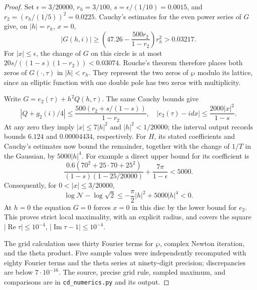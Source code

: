 \begin{proof}
Set $\epsilon=3/20000$, $r_h=3/100$, $s=\epsilon/(1/10)=0.0015$,
and $r_2=(r_h/(1/5))^2=0.0225$.
Cauchy's estimates for the even power series of $G$ give, on
$|h|=r_h$, $x=0$,
\[
 |G(h,i)|\geq
 \left(47.26-\frac{500r_2}{1-r_2}\right)r_h^2>0.03217.
\]
For $|x|\leq\epsilon$, the change of $G$ on this circle is at most
$20s/((1-s)(1-r_2))<0.03074$. Rouche's theorem therefore places both
zeros of $G(\cdot,\tau)$ in $|h|<r_h$. They represent the two zeros of
$\wp$ modulo its lattice, since an elliptic function with one double
pole has two zeros with multiplicity.

Write $G=e_2(\tau)+h^2Q(h,\tau)$. The same Cauchy bounds give
\[
 |Q+g_2(i)/4|\leq
 \frac{500(r_2+s/(1-s))}{1-r_2},
\quad
 |e_2(\tau)-idx|\leq
 \frac{2000|x|^2}{1-s}.
\]
At any zero they imply $|x|\leq7|h|^2$ and $|h|^2<1/20000$;
the interval output records bounds $6.124$ and $0.00004434$,
respectively. For $H$, its stated coefficients and Cauchy's estimates
now bound the remainder, together with the change of $1/T$ in the
Gaussian, by $5000|h|^4$. For example a direct upper bound for its
coefficient is
\[
 \frac{0.6(70^2+25\cdot70+25^2)}
 {(1-s)(1-25/20000)}+\frac{7\pi}{1-\epsilon}<5000.
\]
Consequently, for $0<|x|\leq3/20000$,
\[
 \log\mathcal N-\log\sqrt2
 \leq-\frac\pi2|h|^2+5000|h|^4<0.
\]
At $h=0$ the equation $G=0$ forces $x=0$ in this disc by the lower
bound for $e_2$. This proves strict local maximality, with an explicit
radius, and covers the square
$|\operatorname{Re}\tau|\leq10^{-4}$,
$|\operatorname{Im}\tau-1|\leq10^{-4}$.

The grid calculation uses thirty Fourier terms for $\wp$, complex
Newton iteration, and the theta product. Five sample values were
independently recomputed with eighty Fourier terms and the theta series
at ninety-digit precision; discrepancies are below $7\cdot10^{-16}$.
The source, precise grid rule, sampled maximum, and comparisons are in
\texttt{cd\_numerics.py} and its output.
\end{proof}

